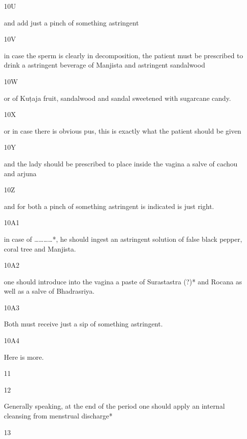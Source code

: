 \begin{translation}
\begin{tt}
\item[10U]

and add just a pinch of something astringent
  
\item[10V]

in case the sperm is clearly in decomposition, the patient must be 
  prescribed to drink a astringent beverage of Manjista and astringent sandalwood
  
\item[10W]

or of Kuṭaja fruit, sandalwood and sandal sweetened with sugarcane 
  candy.
  
\item[10X]

or in case there is obvious pus, this is exactly what the patient should 
  be given
  
\item[10Y]

 and the lady should be prescribed to place  inside the vagina a salve of 
  cachou and arjuna
  
\item[10Z]

and for both a pinch of something astringent is indicated is just right.
  
\item[10A1]

in case of …………*, he should ingest an astringent solution of false 
  black pepper, coral tree and Manjista.
  
\item[10A2]

one should introduce into the vagina a paste of Surastastra (?)* and 
  Rocana as well as  a salve of Bhadrasriya.
  
\item[10A3]

Both must receive just a sip of something astringent.
  
\item[10A4]

Here is more.
  
\item[11]


  
\item[12]

Generally speaking, at the end of the period one should apply an internal 
  cleansing from menstrual discharge*
  
  
\item[13]


\end{tt}
\end{translation}
